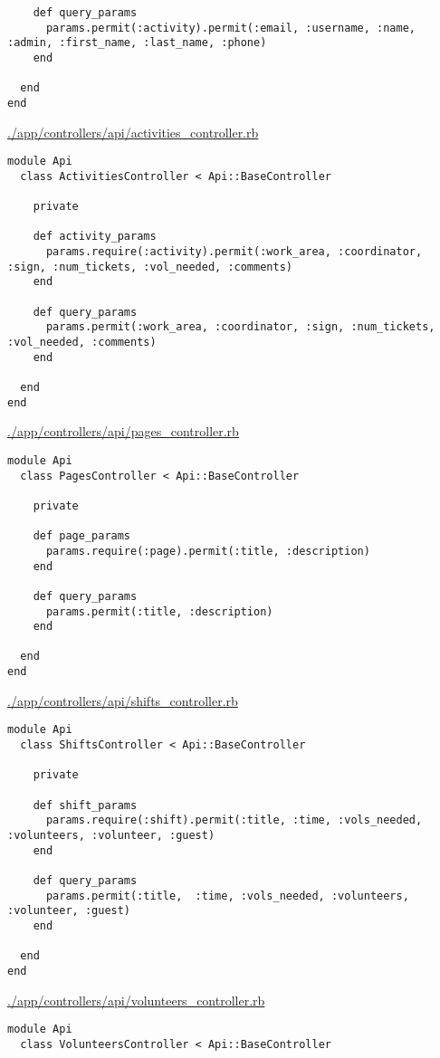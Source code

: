 \documentclass[11pt]{article}
\begin{document}
\begin{itemize}
\begin{itemize}
\begin{itemize}
\begin{verbatim}
    def query_params
      params.permit(:activity).permit(:email, :username, :name, :admin, :first_name, :last_name, :phone)
    end

  end
end
\end{verbatim}

\url{./app/controllers/api/activities_controller.rb}

\begin{verbatim}
module Api
  class ActivitiesController < Api::BaseController

    private

    def activity_params
      params.require(:activity).permit(:work_area, :coordinator, :sign, :num_tickets, :vol_needed, :comments)
    end

    def query_params
      params.permit(:work_area, :coordinator, :sign, :num_tickets, :vol_needed, :comments)
    end

  end
end
\end{verbatim}

\url{./app/controllers/api/pages_controller.rb}

\begin{verbatim}
module Api
  class PagesController < Api::BaseController

    private

    def page_params
      params.require(:page).permit(:title, :description)
    end

    def query_params
      params.permit(:title, :description)
    end

  end
end
\end{verbatim}

\url{./app/controllers/api/shifts_controller.rb}

\begin{verbatim}
module Api
  class ShiftsController < Api::BaseController

    private

    def shift_params
      params.require(:shift).permit(:title, :time, :vols_needed, :volunteers, :volunteer, :guest)
    end

    def query_params
      params.permit(:title,  :time, :vols_needed, :volunteers, :volunteer, :guest)
    end

  end
end
\end{verbatim}

\url{./app/controllers/api/volunteers_controller.rb}

\begin{verbatim}
module Api
  class VolunteersController < Api::BaseController


\end{verbatim}
\end{itemize}
\end{itemize}
\end{itemize}
\end{document}
